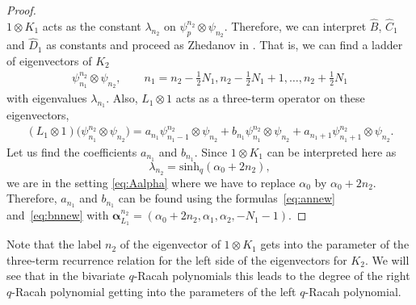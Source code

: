 \documentclass[pdftex]{sigma}
\numberwithin{equation}{section}
\newcommand{\half}{\frac{1}{2}}
\newcommand{\psimn}[2]{\psi_{#1}^{#2}\otimes \psi_{#2}}
\newcommand{\shq}{\mathrm{sinh}_q}
\begin{document}
\begin{proof}
\[	\]
	$1\otimes K_1$ acts as the constant $\lambda_{n_2}$ on $\psimn{p}{n_2}$. Therefore, we can interpret $\hat{B}$, $\hat{C}_1$ and $\hat{D}_1$ as constants and proceed as Zhedanov in \cite{Zhedanov1991}. That is, we can find a ladder of eigenvectors of $K_2$
	\begin{gather*}
		\psimn{n_1}{n_2},\qquad n_1= n_2-\half N_1, n_2-\half N_1 +1,\ldots, n_2+\half N_1
	\end{gather*}		
	with eigenvalues $\lambda_{n_1}$. Also, $L_1\otimes 1$ acts as a three-term operator on these eigenvectors,
\begin{gather*}
(L_1\otimes 1)\big(\psi_{n_1}^{n_2}\otimes\psi_{n_2}\big)= a_{n_1} \psi_{n_1-1}^{n_2}\otimes\psi_{n_2} + b_{n_1} \psi_{n_1}^{n_2}\otimes\psi_{n_2} + a_{n_1+1}\psi_{n_1+1}^{n_2}\otimes\psi_{n_2}.
\end{gather*}
Let us find the coefficients $a_{n_1}$ and $b_{n_1}$. Since $1\otimes K_1$ can be interpreted here as
\[
\lambda_{n_2}=\shq(\alpha_0 +2n_2),
\]
	we are in the setting \eqref{eq:Aalpha} where we have to replace $\alpha_0$ by $\alpha_0 + 2n_2$. Therefore, $a_{n_1}$ and $b_{n_1}$ can be found using the formulas~\eqref{eq:annew} and~\eqref{eq:bnnew} with $\bm{\alpha}_{L_1}^{n_2}=(\alpha_0+2n_2,\alpha_1,\alpha_2,-N_1-1)$.
\end{proof}
\begin{Remark}
	Note that the label $n_2$ of the eigenvector of $1\otimes K_1$ gets into the parameter of the three-term recurrence relation for the left side of the eigenvectors for $K_2$. We will see that in the bivariate $q$-Racah polynomials this leads to the degree of the right $q$-Racah polynomial getting into the parameters of the left $q$-Racah polynomial.
\end{Remark}
\end{document}
